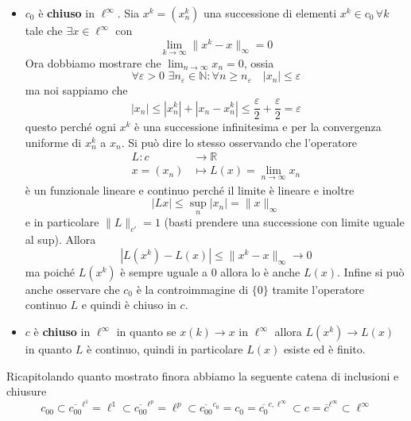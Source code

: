 \begin{itemize}[label = --]
    \item \(c_0\) è \textbf{chiuso} in \(\ell^\infty \). Sia \(x^{k} = {(x^{k}_n)}\) una successione di elementi \(x^{k} \in c_{0} \,
    \forall k\) tale che \(\exists x \in \ell^{\infty}\) con 
    \[
        \lim_{k \to \infty} \|x^{k} - x\|_\infty = 0
    \]
    Ora dobbiamo mostrare che \(\lim_{n \to \infty} x_{n} = 0\), ossia
    \[
        \forall \varepsilon > 0\, \,  \exists n_\varepsilon \in \mathbb{N} : \forall
        n\ge n_\varepsilon \quad |x_{n}| \le \varepsilon
    \]
    ma noi sappiamo che
    \[
        |x_n| \le |x_n^{k}| + |x_{n} - x_{n}^{k}| \le \frac{\varepsilon}{2} +
        \frac{\varepsilon}{2} = \varepsilon
    \]
    questo perché ogni \(x^{k}\) è una successione infinitesima e per la convergenza
    uniforme di \(x_{n}^{k}\) a \(x_{n}\).
    Si può dire lo stesso
    osservando che l'operatore 
    \begin{align}\label{eq:operatore_lim}
      L: c &\longrightarrow \mathbb{R} \\
      x = {(x_{n})} &\longmapsto L(x) = \lim_{n \to \infty} x_{n}
    \end{align}
    è un funzionale lineare e continuo perché il limite è lineare e inoltre
    \[
      |Lx| \le \sup_{n} |x_{n}| = \|x\|_\infty 
    \]
    e in particolare \(\|L\|_{c'} = 1\) (basti prendere una successione con limite
    uguale al sup). Allora
    \[
      |L{(x^{k})} - L{(x)}| \le \|x^{k} - x\|_\infty \to 0
    \]
    ma poiché \(L{(x^{k})}\) è sempre uguale a \(0\) allora lo è anche \(L{(x)}\).
    Infine si può anche osservare che \(c_{0}\) è la controimmagine di \(\{0\} \)
    tramite l'operatore continuo \(L\) e quindi è chiuso in \(c\).

    \item \(c\) è \textbf{chiuso} in \(\ell^{\infty}\) in quanto se \(x{(k)} \to x\) in
    \(\ell^{\infty}\) allora \(L{(x^{k})} \to L{(x)}\) in quanto \(L\) è continuo,
    quindi in particolare \(L{(x)}\) esiste ed è finito.
\end{itemize}

\begin{proposition} Ricapitolando quanto mostrato finora abbiamo la seguente
    catena di inclusioni e chiusure
    \[
      c_{00} \subset \overline{c_{00} }^{\ell^{1}}  =  \ell^{1} \subset
      \overline{c_{00} }^{\ell^{p}} = \ell^{p} \subset
      \overline{c_{00}}^{c_{0}} = c_{0} = \overline{c_{0}}^{c, \ell^{\infty}}
      \subset c = \overline{c}^{\ell^{\infty}} \subset \ell^{\infty} 
    \]
\end{proposition}

